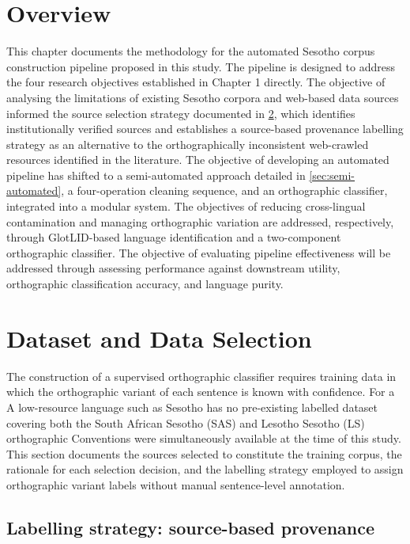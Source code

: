\documentclass[12pt]{ThesisRU}
\begin{document}
\section{Overview}
This chapter documents the methodology for the automated Sesotho corpus construction pipeline proposed in this study. The pipeline is designed to address the four research objectives established in Chapter 1 directly. The objective of analysing the limitations of existing Sesotho corpora and web-based data sources informed the source selection strategy documented in \ref{sec:data_selection}, which identifies institutionally verified sources and establishes a source-based provenance labelling strategy as an alternative to the orthographically inconsistent web-crawled resources identified in the literature. The objective of developing an automated pipeline has shifted to a semi-automated approach detailed in \ref{sec:semi-automated}, a four-operation cleaning sequence, and an orthographic classifier, integrated into a modular system. The objectives of reducing cross-lingual contamination and managing orthographic variation are addressed, respectively, through GlotLID-based language identification and a two-component orthographic classifier. The objective of evaluating pipeline effectiveness will be addressed through assessing performance against downstream utility, orthographic classification accuracy, and language purity.

\section{Dataset and Data Selection}
\label{sec:data_selection}

The construction of a supervised orthographic classifier requires training data in
which the orthographic variant of each sentence is known with confidence. For a
A low-resource language such as Sesotho has no pre-existing labelled dataset covering
both the South African Sesotho (SAS) and Lesotho Sesotho (LS) orthographic
Conventions were simultaneously available at the time of this study. This section
documents the sources selected to constitute the training corpus, the rationale
for each selection decision, and the labelling strategy employed to assign
orthographic variant labels without manual sentence-level annotation.

\subsection{Labelling strategy: source-based provenance}
\end{document}
